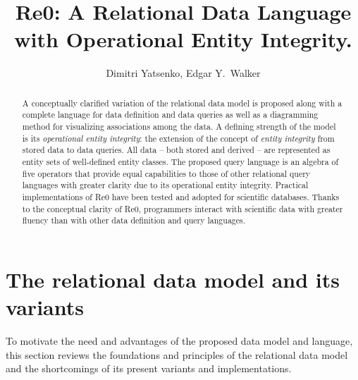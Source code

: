 \documentclass[a4paper,10pt]{article}
\title{Re0: A Relational Data Language with Operational Entity Integrity.}
\author{Dimitri Yatsenko, Edgar Y.\ Walker}
\begin{document}
\maketitle
\begin{abstract}
A conceptually clarified variation of the relational data model is proposed along with a complete language for data definition and data queries as well as a diagramming method for visualizing associations among the data.  
A defining strength of the model is its \emph{operational entity integrity}: the extension of the concept of \emph{entity integrity} from stored data to data queries. 
All data -- both stored and derived -- are represented as entity sets of well-defined entity classes.  
The proposed query language is an algebra of five operators that provide equal capabilities to those of other relational query languages with greater clarity due to its operational entity integrity. 
Practical implementations of Re0 have been tested and adopted for scientific databases.  Thanks to the conceptual clarity of Re0, programmers interact with scientific data with greater fluency than with other data definition and query languages.

\end{abstract}

\section{The relational data model and its variants}
To motivate the need and advantages of the proposed data model and language, this section reviews the foundations and principles of the relational data model and the shortcomings of its present variants and implementations. 
\end{document}
